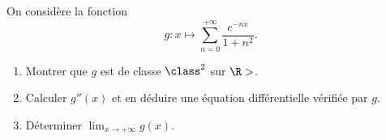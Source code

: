 \begin{enonce}
\begin{exercise}[ID={RMS135 E1456},subtitle={IMT MP 2024},tags={},difficulty={}]

On considère la fonction
  \begin{equation*}
    g : x \mapsto \sum_{n=0}^{+\infty} \frac{e^{-nx}}{1 + n^2}.
  \end{equation*}

\begin{enumerate}
  \item Montrer que $g$ est de classe $\class^2$ sur $\R>$.
  \item Calculer $g''(x)$ et en déduire une équation différentielle vérifiée par $g$.
  \item Déterminer $\displaystyle \lim_{x \to +\infty} g(x)$.
\end{enumerate}

\end{exercise}
\begin{solution}
\end{solution}
\end{enonce}
